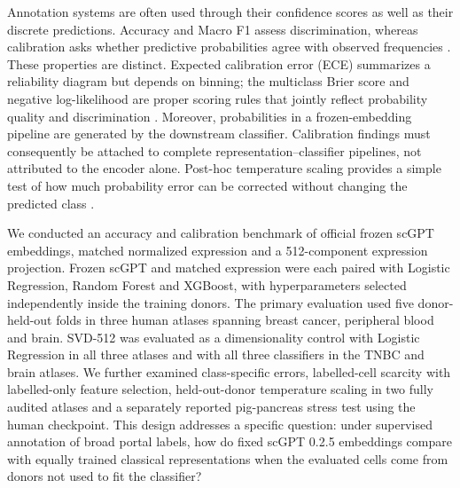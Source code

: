 Annotation systems are often used through their confidence scores as well as their discrete predictions. Accuracy and Macro F1 assess discrimination, whereas calibration asks whether predictive probabilities agree with observed frequencies \citep{Guo2017,Vaicenavicius2019,SilvaFilho2023}. These properties are distinct. Expected calibration error (ECE) summarizes a reliability diagram but depends on binning; the multiclass Brier score and negative log-likelihood are proper scoring rules that jointly reflect probability quality and discrimination \citep{Brier1950,Gneiting2007,Nixon2019}. Moreover, probabilities in a frozen-embedding pipeline are generated by the downstream classifier. Calibration findings must consequently be attached to complete representation--classifier pipelines, not attributed to the encoder alone. Post-hoc temperature scaling provides a simple test of how much probability error can be corrected without changing the predicted class \citep{Guo2017}.

We conducted an accuracy and calibration benchmark of official frozen scGPT embeddings, matched normalized expression and a 512-component expression projection. Frozen scGPT and matched expression were each paired with Logistic Regression, Random Forest and XGBoost, with hyperparameters selected independently inside the training donors. The primary evaluation used five donor-held-out folds in three human atlases spanning breast cancer, peripheral blood and brain. SVD-512 was evaluated as a dimensionality control with Logistic Regression in all three atlases and with all three classifiers in the TNBC and brain atlases. We further examined class-specific errors, labelled-cell scarcity with labelled-only feature selection, held-out-donor temperature scaling in two fully audited atlases and a separately reported pig-pancreas stress test using the human checkpoint. This design addresses a specific question: under supervised annotation of broad portal labels, how do fixed scGPT 0.2.5 embeddings compare with equally trained classical representations when the evaluated cells come from donors not used to fit the classifier?

